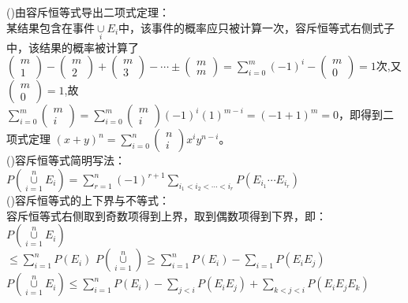 \documentclass{book}%
\begin{document}
	()由容斥恒等式导出二项式定理：\\某结果包含在事件$\mathop{\cup}\limits_{i}E_{i}$中，该事件的概率应只被计算一次，容斥恒等式右侧式子中，该结果的概率被计算了$\begin{pmatrix}m\\1\end{pmatrix}-\begin{pmatrix}m\\2\end{pmatrix}+\begin{pmatrix}m\\3\end{pmatrix}-\cdots \pm\begin{pmatrix}m\\m\end{pmatrix}=\sum\limits_{i=0}^{m}(-1)^{i}-\begin{pmatrix}m\\0\end{pmatrix}=1$次,又$\begin{pmatrix}m\\0\end{pmatrix}=1$,故$\sum\limits_{i=0}^{m}\begin{pmatrix}m\\i\end{pmatrix}=\sum\limits_{i=0}^{m}\begin{pmatrix}m\\i\end{pmatrix}(-1)^{i}(1)^{m-i}=(-1+1)^m=0$，即得到二项式定理	$\displaystyle (x+y)^{n}=\sum_{i=0}^{n}\begin{pmatrix}n\\i\end{pmatrix}x^iy^{n-i}$。\\
	()容斥恒等式简明写法：\\
	$P(\mathop{\cup}\limits_{i=1}^{n}E_{i})=\sum\limits_{r=1}^{n}(-1)^{r+1}\sum\limits_{i_{1}<i_{2}<\cdots <i_{r}}P(E_{i_{1}}\cdots E_{i_{r}})$\\
	()容斥恒等式的上下界与不等式：\\
	容斥恒等式右侧取到奇数项得到上界，取到偶数项得到下界，即：\\
	$P(\mathop\cup \limits_{i=1}^{n}E_{i})$\\
	$\leq \sum\limits_{i=1}^{n}P(E_{i})$
	$P(\mathop\cup\limits_{i=1}^{n})\geq \sum\limits_{i=1}^{n}P(E_{i})-\sum\limits_{i=1}P(E_{i}E_{j})$\\
	$P(\mathop\cup\limits_{i=1}^{n}E_{i})\leq \sum\limits_{i=1}^{n}P(E_{i})-\sum\limits_{j<i}P(E_{i}E_{j})+\sum\limits_{k<j<i}P(E_{i}E_{j}E_{k})$\\
\end{document}

